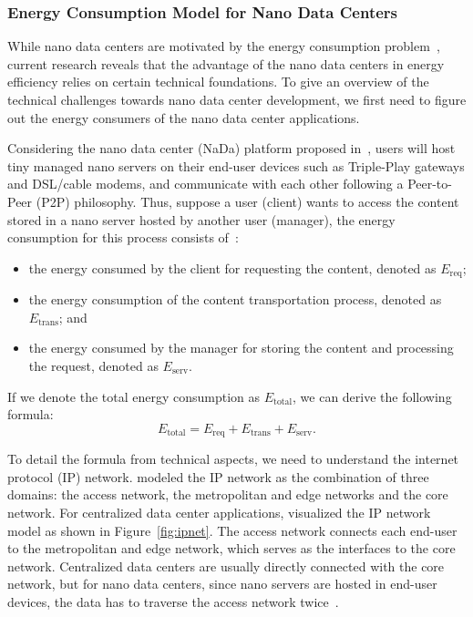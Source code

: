 \subsubsection{Energy Consumption Model for Nano Data Centers} \label{sec:model}

While nano data centers are motivated by the energy consumption problem~\cite{DBLP:conf/conext/ValanciusLMDR09},
current research reveals that the advantage of the nano data centers in energy efficiency relies on certain technical foundations.
To give an overview of the technical challenges towards nano data center development,
we first need to figure out the energy consumers of the nano data center applications.

Considering the nano data center (NaDa) platform proposed in~\cite{DBLP:conf/conext/ValanciusLMDR09},
users will host tiny managed nano servers on their end-user devices such as Triple-Play gateways and DSL/cable modems,
and communicate with each other following a Peer-to-Peer (P2P) philosophy.
Thus, suppose a user (client) wants to access the content stored in a nano server hosted by another user (manager),
the energy consumption for this process consists of~\cite{DBLP:journals/sigmetrics/JalaliAVHAT14}:
\begin{itemize}
\item the energy consumed by the client for requesting the content, denoted as $E_\text{req}$;
\item the energy consumption of the content transportation process, denoted as $E_\text{trans}$; and
\item the energy consumed by the manager for storing the content and processing the request, denoted as $E_\text{serv}$.
\end{itemize}
If we denote the total energy consumption as $E_\text{total}$, we can derive the following formula:
\begin{equation}
E_\text{total}=E_\text{req}+E_\text{trans}+E_\text{serv} \label{abstract_model}.
\end{equation}

To detail the formula from technical aspects, we need to understand the internet protocol (IP) network.
\cite{iptv} modeled the IP network as the combination of three domains:
the access network, the metropolitan and edge networks and the core network.
For centralized data center applications,
\cite{iptv} visualized the IP network model as shown in Figure~\ref{fig:ipnet}.
The access network connects each end-user to the metropolitan and edge network,
which serves as the interfaces to the core network.
Centralized data centers are usually directly connected with the core network,
but for nano data centers, since nano servers are hosted in end-user devices,
the data has to traverse the access network twice~\cite{tradeoff}.
 
